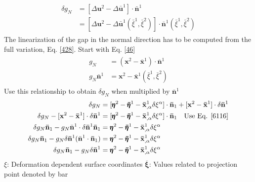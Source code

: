 \documentclass[12pt,3p]{article}
\numberwithin{equation}{section}
\begin{document}
\begin{align}\label{6115}
\begin{split}
\delta g_N &= [\Delta \mathbf{u}^2 - \Delta \mathbf{\bar{u}}^1] \cdot \mathbf{\bar{n}}^1 \\
		&=  [\Delta \mathbf{u}^2 - \Delta \mathbf{\bar{u}}^1 (\bar{\xi}^1, \bar{\xi}^2)] \cdot \mathbf{\bar{n}}^1 (\bar{\xi}^1, \bar{\xi}^2)
\end{split}
\end{align}
The linearization of the gap in the normal direction has to be computed from the full variation, Eq. \ref{428}. 
Start with Eq. \ref{46}
\begin{align}\label{6116}
\begin{split}
g_N &= (\mathbf{x}^2 - \mathbf{\bar{x}}^1) \cdot \bar{\mathbf{n}}^1 \\
g_N \bar{\mathbf{n}}^1 &= \mathbf{x}^2 - \mathbf{\bar{x}}^1 (\bar{\xi}^1, \bar{\xi}^2) 
\end{split}
\end{align}
Use this relationship to obtain $\delta g_N$ when multiplied by $\mathbf{\bar{n}}^1$
\begin{align}
\begin{split}
\delta g_N &= [ \pmb{\eta}^2 - \pmb{\bar{\eta}}^1 - \mathbf{\bar{x}}^1_{,\alpha} \delta \xi^\alpha ] \cdot \mathbf{\bar{n}}_1 + [\mathbf{x}^2 - \mathbf{\bar{x}}^1] \cdot \delta \mathbf{\bar{n}}^1 \\
\delta g_N - [\mathbf{x}^2 - \mathbf{\bar{x}}^1] \cdot \delta \mathbf{\bar{n}}^1 &= [ \pmb{\eta}^2 - \pmb{\bar{\eta}}^1 - \mathbf{\bar{x}}^1_{,\alpha} \delta \xi^\alpha ] \cdot \mathbf{\bar{n}}_1 \quad \text{Use Eq. \ref{6116}}\\
\delta g_N \mathbf{\bar{n}}_1 - g_N \bar{\mathbf{n}}^1 \cdot \delta \mathbf{\bar{n}}^1  \mathbf{\bar{n}}_1 &= \pmb{\eta}^2 - \pmb{\bar{\eta}}^1 - \mathbf{\bar{x}}^1_{,\alpha} \delta \xi^\alpha \\
\delta g_N \mathbf{\bar{n}}_1 - g_N \delta \mathbf{\bar{n}}^1 (\bar{\mathbf{n}}^1 \cdot \mathbf{\bar{n}}_1) &= \pmb{\eta}^2 - \pmb{\bar{\eta}}^1 - \mathbf{\bar{x}}^1_{,\alpha} \delta \xi^\alpha \\
\delta g_N \mathbf{\bar{n}}_1 - g_N \delta \mathbf{\bar{n}}^1 &= \pmb{\eta}^2 - \pmb{\bar{\eta}}^1 - \mathbf{\bar{x}}^1_{,\alpha} \delta \xi^\alpha
\end{split}
\end{align}
$\xi$: Deformation dependent surface coordinates 
$\pmb{\bar{\xi}}$: Values related to projection point denoted by bar \\
\end{document}
